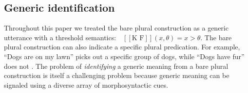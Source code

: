 \documentclass[12pt,letterpaper]{article}
\newcommand{\denote}[1]{\mbox{ $[\![ #1 ]\!]$}}
\newcommand{\ndg}[1]{\textcolor{Green}{[ndg: #1]}}
\newcommand{\mht}[1]{\textcolor{Blue}{[mht: #1]}}
\begin{document}

















\subsection*{Generic identification}

Throughout this paper we treated the bare plural construction as a generic utterance with a threshold semantics: $\denote{\text{K F}}(x, \theta)=x>\theta$.
The bare plural construction can also indicate a specific plural predication.
For example, ``Dogs are on my lawn'' picks out a specific group of dogs, while ``Dogs have fur''  does not \cite{Carlson1977}.
The problem of \emph{identifying} a generic meaning from a bare plural construction is itself a challenging problem because generic meaning can be signaled using a diverse array of morphosyntactic cues.
\end{document}
